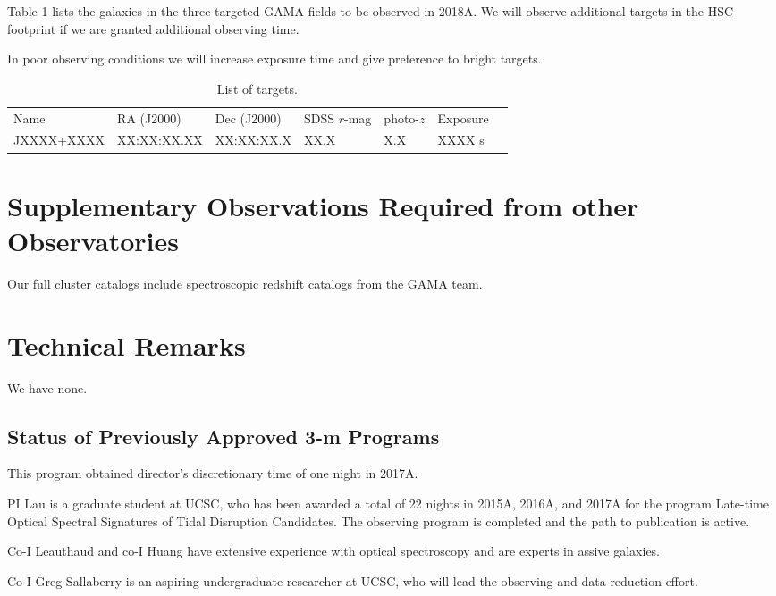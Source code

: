\documentclass[letterpaper,12pt]{article}
\begin{document}
Table 1 lists the galaxies in the three targeted GAMA fields to be observed in 2018A. We will observe additional
targets in the HSC footprint if we are granted additional observing time.

In poor observing conditions we will increase exposure time and give preference to bright targets. 

\begin{table}
\caption{List of targets.}
\begin{tabular}{lllllll}
\hline
Name & RA (J2000) & Dec (J2000) & SDSS $r$-mag & photo-$z$ & Exposure \\
JXXXX+XXXX & XX:XX:XX.XX & XX:XX:XX.X & XX.X & X.X & XXXX s & \\
\hline
\end{tabular}
\end{table}

\section{Supplementary Observations Required from other Observatories}

Our full cluster catalogs include spectroscopic redshift catalogs from the GAMA team. 

\section{Technical Remarks}

We have none. 

\subsection{Status of Previously Approved 3-m Programs}

This program obtained director's discretionary time of one night in 2017A.

PI Lau is a graduate student at UCSC, who has been awarded a total of 22 nights in 2015A, 2016A, 
and 2017A for the program Late-time Optical Spectral Signatures of Tidal Disruption Candidates. 
The observing program is completed and the path to publication is active. 

Co-I Leauthaud and co-I Huang have extensive experience with optical spectroscopy and are experts 
in assive galaxies. 

Co-I Greg Sallaberry is an aspiring undergraduate researcher at UCSC, who will lead the observing 
and data reduction effort. 
\end{document}

